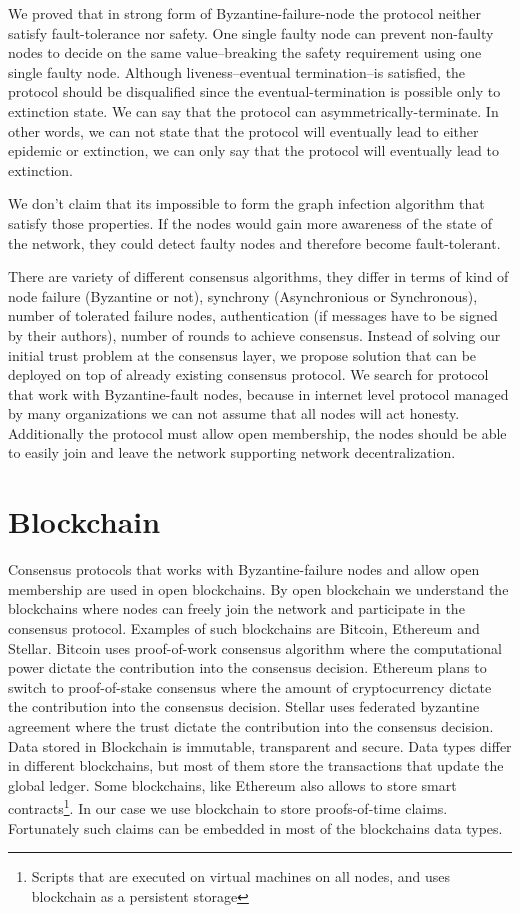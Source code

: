 \documentclass[nostrict]{szablonPG}
\begin{document}
We proved that in strong form of Byzantine-failure-node the protocol neither satisfy fault-tolerance nor safety. One single faulty node can prevent non-faulty nodes to decide on the same value--breaking the safety requirement using one single faulty node. Although liveness--eventual termination--is satisfied, the protocol should be disqualified since the eventual-termination is possible only to extinction state. We can say that the protocol can asymmetrically-terminate. In other words, we can not state that the protocol will eventually lead to either epidemic or extinction, we can only say that the protocol will eventually lead to extinction.

We don't claim that its impossible to form the graph infection algorithm that satisfy those properties. If the nodes would gain more awareness of the state of the network, they could detect faulty nodes and therefore become fault-tolerant.

There are variety of different consensus algorithms, they differ in terms of kind of node failure (Byzantine or not), synchrony (Asynchronious or Synchronous), number of tolerated failure nodes, authentication (if messages have to be signed by their authors), number of rounds to achieve consensus. Instead of solving our initial trust problem at the consensus layer, we propose solution that can be deployed on top of already existing consensus protocol. We search for protocol that work with Byzantine-fault nodes, because in internet level protocol managed by many organizations we can not assume that all nodes will act honesty. Additionally the protocol must allow open membership, the nodes should be able to easily join and leave the network supporting network decentralization. 

\section{Blockchain}
Consensus protocols that works with Byzantine-failure nodes and allow open membership are used in open blockchains. By open blockchain we understand the blockchains where nodes can freely join the network and participate in the consensus protocol. Examples of such blockchains are Bitcoin, Ethereum and Stellar. Bitcoin uses proof-of-work consensus algorithm where the computational power dictate the contribution into the consensus decision. Ethereum plans to switch to proof-of-stake consensus where the amount of cryptocurrency dictate the contribution into the consensus decision. Stellar uses federated byzantine agreement where the trust dictate the contribution into the consensus decision. Data stored in Blockchain is immutable, transparent and secure. Data types differ in different blockchains, but most of them store the transactions that update the global ledger. Some blockchains, like Ethereum also allows to store smart contracts\footnote{Scripts that are executed on virtual machines on all nodes, and uses blockchain as a persistent storage}. In our case we use blockchain to store proofs-of-time claims. Fortunately such claims can be embedded in most of the blockchains data types.
\end{document}
